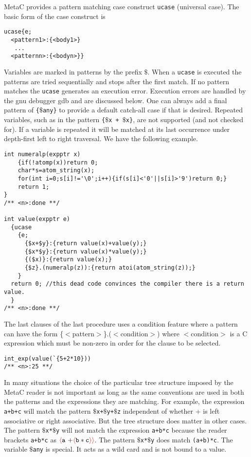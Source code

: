 \documentclass{article}
\newcommand{\fopen}{{\color{red} \langle}}
\newcommand{\fclose}{{\color{red} \rangle}}
\begin{document}
MetaC provides a pattern matching case construct {\tt ucase} (universal case).
The basic form of the case construct is

\begin{verbatim}
ucase{e;
  <pattern1>:{<body1>}
   ...
  <patternn>:{<bodyn>}}
\end{verbatim}

Variables are marked in patterns by the prefix $\$$.  When a {\tt ucase} is executed the patterns are tried sequentially and stops after the first match.
If no pattern matches the {\tt ucase} generates an execution error.
Execution errors are handled by the gnu debugger gdb and are discussed below.
One can always add a final pattern of {\tt \{$\$$any\}} to provide a default
catch-all case if that is desired.
Repeated variables, such as in the pattern {\tt \{$\$$x + $\$$x\}}, are not supported (and not checked for).
If a variable is repeated it will be matched at its last occurrence under depth-first left to right traversal.
We have the following example.

\begin{verbatim}
int numeralp(expptr x)
    {if(!atomp(x))return 0;
    char*s=atom_string(x);
    for(int i=0;s[i]!='\0';i++){if(s[i]<'0'||s[i]>'9')return 0;}
    return 1;
}
/** <n>:done **/

int value(expptr e)
  {ucase
    {e;
      {$x+$y}:{return value(x)+value(y);}
      {$x*$y}:{return value(x)*value(y);}
      {($x)}:{return value(x);}
      {$z}.(numeralp(z)):{return atoi(atom_string(z));}
    }
  return 0; //this dead code convinces the compiler there is a return value.
  }
/** <n>:done **/
\end{verbatim}

The last clauses of the last procedure uses a condition feature where a pattern can have the
form \{$<$pattern$>$\}.($<$condition$>$)
where $<$condition$>$ is a C expression which must be non-zero in order for the clause to be selected.

\begin{verbatim}
int_exp(value(`{5+2*10}))
/** <n>:25 **/
\end{verbatim}

In many situations the choice of the particular tree structure imposed by the MetaC reader is not important as long as the same conventions are used in both the patterns and the expressions
they are matching.  For example, the expression {\tt a+b+c} will match the pattern
{\tt $\$$x+$\$$y+$\$$z} independent of whether + is left associative or right associative.  But the tree structure does matter in other cases.  The pattern {\tt $\$$x*$\$$y}
will not match the expression {\tt a+b*c} because the reader brackets {\tt a+b*c} as  $\fopen \mathtt{a~+} \fopen \mathtt{b * c} \fclose\fclose$. The pattern {\tt $\$$x*$\$$y} does match {\tt (a+b)*c}.
The variable {\tt $\$$any} is special.  It acts as a wild card and is not bound to a value.
\end{document}
